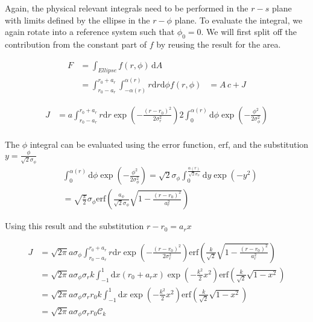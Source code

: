 \documentclass[a4paper]{scrartcl}
\begin{document}
Again, the physical relevant integrals need to be performed in the $r-s$ plane with limits defined by
the ellipse in the $r-\phi$ plane.
To evaluate the integral, we again rotate into a reference system such that $\phi_0 = 0$.
We will first split off the contribution from the constant part of $f$ by reusing the result for the area.

\begin{align}
  F & = \int_{Ellipse} f(r, \phi) \, \mathrm{d}A                                                \\
    & = \int_{r_0 - a_r}^{r_0 + a_r} \int_{-\alpha(r)}^{\alpha(r)} r \mathrm{d}r \mathrm{d}\phi
  f(r, \phi)
    & = A \,c + J
\end{align}

\begin{align}
  J & = a \int_{r_0 - a_r}^{r_0 + a_r} r \mathrm{d}r \exp\left( - \frac{(r-r_0)^2}{2 \sigma_r^2} \right)
  2 \int_0^{\alpha(r)} \mathrm{d}\phi \exp\left( - \frac{\phi^2}{2\sigma_\phi^2} \right)                 \\
\end{align}

The $\phi$ integral can be evaluated using the error function, $\mathrm{erf}$, and the substitution
$y = \frac{\phi}{\sqrt{2} \sigma_\phi}$
\begin{align}
   & \int_0^{\alpha(r)} \mathrm{d} \phi \exp\left( - \frac{\phi^2}{2\sigma_\phi^2} \right)
  = \sqrt{2} \sigma_\phi \int_0^{\frac{\alpha(r)}{\sqrt{2} \sigma_\phi}} \mathrm{d}y \exp(-y^2)                                            \\
   & = \sqrt{\frac{\pi}{2}} \sigma_\phi \mathrm{erf} \left( \frac{a_\phi}{\sqrt{2} \sigma_\phi} \sqrt{1 - \frac{(r-r_0)^2}{a_r^2}} \right)
\end{align}

Using this result and the substitution $r - r_0 = a_r x$

\begin{align}
  J & = \sqrt{2\pi} a \sigma_\phi \int_{r_0 - a_r}^{r_0 + a_r} r \mathrm{d}r \exp\left( - \frac{(r-r_0)^2}{2 \sigma_r^2}\right)
  \mathrm{erf} \left( \frac{k}{\sqrt{2}} \sqrt{1 - \frac{(r-r_0)^2}{a_r^2}} \right)                                             \\
    & = \sqrt{2\pi} a \sigma_\phi \sigma_r k \int_{-1}^{1} \mathrm{d}x (r_0 + a_r x)  \exp\left( - \frac{k^2}{2} x^2\right)
  \mathrm{erf} \left( \frac{k}{\sqrt{2}} \sqrt{1 - x^2} \right)                                                                 \\
    & = \sqrt{2\pi} a \sigma_\phi \sigma_r r_0 k \int_{-1}^{1} \mathrm{d}x \exp\left( - \frac{k^2}{2} x^2\right)
  \mathrm{erf} \left( \frac{k}{\sqrt{2}} \sqrt{1 - x^2} \right)                                                                 \\
    & = \sqrt{2\pi} a \sigma_\phi \sigma_r r_0 \mathcal{C}_k
\end{align}
\end{document}
